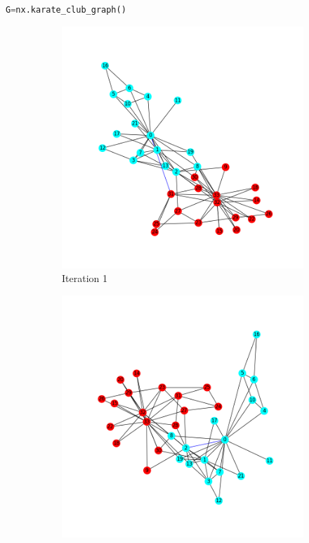 \documentclass[11pt]{article} %
\begin{document}
\begin{lstlisting}[language = Python, caption=Karate Club Graph]
 G=nx.karate_club_graph()
\end{lstlisting} \bigskip 


\begin{figure}[h!]
  \centering
  \begin{subfigure}[b]{0.4\linewidth}
    \includegraphics[width=\linewidth]{../Figures/Iteration1.png}
    \caption{Iteration 1}
  \end{subfigure}
  \begin{subfigure}[b]{0.4\linewidth}
    \includegraphics[width=\linewidth]{../Figures/Iteration2.png}

\end{subfigure}
\end{figure}
\end{document}
